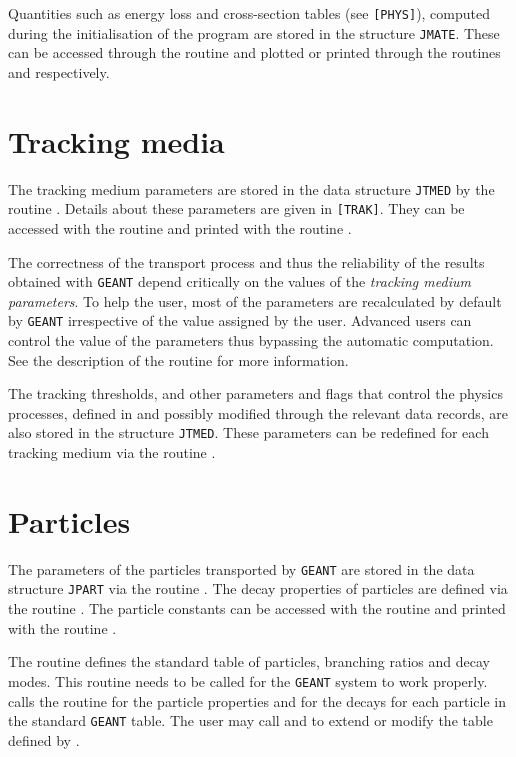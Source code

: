 Quantities such as energy loss and cross-section tables (see {\tt [PHYS]}),
computed during the initialisation of the program are stored in the 
structure {\tt JMATE}. These can be accessed through the routine 
and plotted or printed through the routines  and  
respectively.

\section{Tracking media}
 
The tracking medium
parameters are stored in the data
structure {\tt JTMED} by the routine . Details
about these parameters are given
in {\tt [TRAK]}. They can be accessed with the routine
 and printed with the routine .

The correctness of the transport process and thus the reliability
of the results obtained with {\tt GEANT} depend critically on the
values of the {\it tracking medium parameters}. To help the user,
most of the parameters are recalculated by default by {\tt GEANT}
irrespective of the value assigned by the user. Advanced users
can control the value of the parameters thus bypassing the automatic
computation. See the description of the routine  for
more information.

The tracking thresholds, and other parameters and flags that control
the physics processes, defined in  and possibly
modified through the relevant data records, are also stored in the structure
{\tt JTMED}. These parameters can be redefined for each tracking medium
via the routine .

\section{Particles}
The parameters of the particles transported by {\tt GEANT}
are stored in the data structure
{\tt JPART} via the routine . 
The decay properties of particles are defined via the routine .
The particle constants can be
accessed with the routine  and printed with the routine
.

The routine  defines the standard table of particles,
branching ratios and decay modes. This routine needs to be called for 
the {\tt GEANT} system to work properly. 
 calls the routine  for the
particle properties and  for the decays for
each particle in the standard {\tt GEANT} table. 
The user may call  and
 to extend or modify the table defined by .
